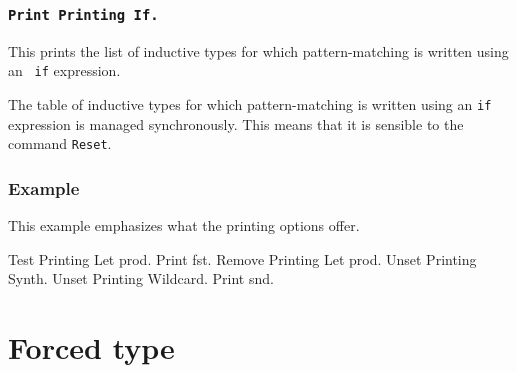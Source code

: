 {\begin{coq_example}
\subsubsection{\tt Print Printing If.}
This prints the list of inductive types
for which pattern-matching is written using an {\tt
if} expression.

The table of inductive types for which pattern-matching is written
using an {\tt if} expression is managed synchronously. This means that
it is sensible to the command {\tt Reset}.

\subsubsection{Example}

This example emphasizes what the printing options offer.

\begin{coq_example}
Test Printing Let prod.
Print fst.
Remove Printing Let prod.
Unset Printing Synth.
Unset Printing Wildcard.
Print snd.
\end{coq_example}






\section{Forced type}


\end{coq_example}}
